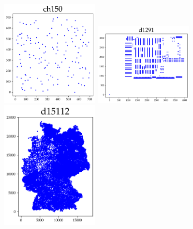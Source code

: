 \begin{appendices}
\begin{figure}[H]
\includegraphics[width=5cm]{../tsplib_euc2d_pictures_of_instances/ch150.png}
\includegraphics[width=5cm]{../tsplib_euc2d_pictures_of_instances/d1291.png}
\includegraphics[width=5cm]{../tsplib_euc2d_pictures_of_instances/d15112.png}
\end{figure}

\begin{figure}[H]
\centering


\end{figure}
\end{appendices}
